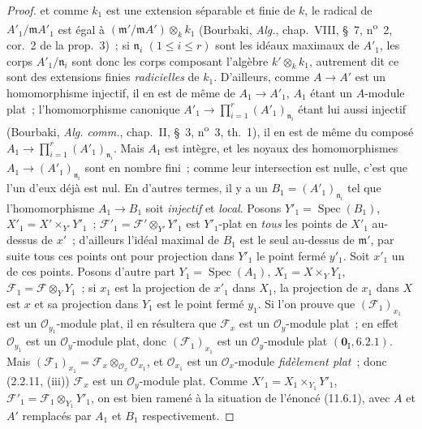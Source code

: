 \begin{proof}
et comme $k_1$ est une extension séparable et finie de $k$, le radical de
$A'_1/\mathfrak m A'_1$ est égal à
$(\mathfrak m'/\mathfrak m A')\otimes_k k_1$ (Bourbaki, \emph{Alg.},
chap.~VIII, \S~7, n\textsuperscript{o}~2, cor.~2 de la prop.~3)~; si $\mathfrak n_i$
$(1\leq i\leq r)$ sont les idéaux maximaux de $A'_1$, les corps
$A'_1/\mathfrak n_i$ sont donc les corps composant l'algèbre
$k'\otimes_k k_1$, autrement dit ce sont des extensions finies
\emph{radicielles} de $k_1$. D'ailleurs, comme $A\to A'$ est un homomorphisme
injectif, il en est de même de $A_1\to A'_1$, $A_1$ étant un $A$-module plat~;
l'homomorphisme canonique
$A'_1\longrightarrow\prod_{i=1}^{r}(A'_1)_{\mathfrak n_i}$
étant lui aussi injectif (Bourbaki, \emph{Alg. comm.}, chap.~II, \S~3,
n\textsuperscript{o}~3, th.~1), il en est de même du composé $A_1\to\prod_{i=1}^{r}(A'_1)_{\mathfrak n_i}$.
Mais $A_1$ est intègre, et les noyaux des homomorphismes
$A_1\to(A'_1)_{\mathfrak n_i}$ sont en nombre fini~; comme leur intersection
est nulle, c'est que l'un d'eux déjà est nul. En d'autres termes, il y a un
$B_1=(A'_1)_{\mathfrak n_i}$ tel que l'homomorphisme $A_1\to B_1$ soit
\emph{injectif} et \emph{local}. Posons $Y'_1=\operatorname{Spec}(B_1)$,
$X'_1=X'\times_{Y'}Y'_1$~; $\mathcal F'_1=\mathcal F'\otimes_{Y'}Y'_1$ est
$Y'_1$-plat en \emph{tous} les points de $X'_1$ au-dessus de $x'$~; d'ailleurs l'idéal
maximal de $B_1$ est le seul au-dessus de $\mathfrak m'$, par suite tous ces
points ont pour projection dans $Y'_1$ le point fermé $y'_1$. Soit $x'_1$ un de
ces points. Posons d'autre part $Y_1=\operatorname{Spec}(A_1)$,
$X_1=X\times_Y Y_1$, $\mathcal F_1=\mathcal F\otimes_Y Y_1$~; si $x_1$ est la
projection de $x'_1$ dans $X_1$, la projection de $x_1$ dans $X$ est $x$ et sa
projection dans $Y_1$ est le point fermé $y_1$. Si l'on prouve que
$(\mathcal F_1)_{x_1}$ est un $\mathcal O_{y_1}$-module plat, il en résultera
que $\mathcal F_x$ est un $\mathcal O_y$-module plat~; en effet
$\mathcal O_{y_1}$ est un $\mathcal O_y$-module plat, donc
$(\mathcal F_1)_{x_1}$ est un $\mathcal O_y$-module plat
$(\mathbf 0_{\mathrm I},6.2.1)$.
Mais $(\mathcal F_1)_{x_1}=\mathcal F_x\otimes_{\mathcal O_x}\mathcal O_{x_1}$,
et $\mathcal O_{x_1}$ est un $\mathcal O_x$-module \emph{fidèlement plat}~;
donc (2.2.11, (iii)) $\mathcal F_x$ est un $\mathcal O_y$-module plat. Comme
$X'_1=X_1\times_{Y_1}Y'_1$, $\mathcal F'_1=\mathcal F_1\otimes_{Y_1}Y'_1$,
on est bien ramené à la situation de l'énoncé (11.6.1), avec $A$ et $A'$
remplacés par $A_1$ et $B_1$ respectivement.


\end{proof}

